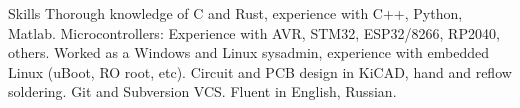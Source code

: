 
\begin{rubric}{Skills}
\entry*[]
  Thorough knowledge of C and Rust, experience with C++, Python, Matlab.
\entry*[]
  Microcontrollers: Experience with AVR, STM32, ESP32/8266, RP2040, others.
\entry*[]
  Worked as a Windows and Linux sysadmin, experience with embedded Linux (uBoot, RO root, etc).
\entry*[]
  Circuit and PCB design in KiCAD, hand and reflow soldering.
\entry*[]
  Git and Subversion VCS.
\entry*[]
  Fluent in English, Russian.
\end{rubric}
